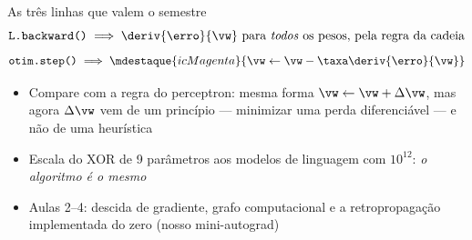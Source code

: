 \documentclass[aspectratio=169, 11pt]{beamer}
\begin{document}
\begin{frame}{As três linhas que valem o semestre}
  \[
    \texttt{L.backward()}
    \;\Longrightarrow\;
    \deriv{\erro}{\vw} \text{ para \emph{todos} os pesos, pela regra da cadeia}
  \]
  \[
    \texttt{otim.step()}
    \;\Longrightarrow\;
    \mdestaque{icMagenta}{\vw \leftarrow \vw - \taxa \deriv{\erro}{\vw}}
  \]

  \begin{itemize}\setlength{\itemsep}{0.35ex}
    \item Compare com a regra do perceptron: mesma forma
          \(\vw \leftarrow \vw + \Delta\vw\), mas agora \(\Delta\vw\) vem de um
          \alert{princípio} — minimizar uma perda diferenciável — e não de uma
          heurística
    \item Escala do XOR de 9 parâmetros aos modelos de linguagem com
          $10^{12}$: \emph{o algoritmo é o mesmo}
    \item Aulas 2--4: descida de gradiente, grafo computacional e a
          retropropagação implementada do zero (nosso mini-autograd)
  \end{itemize}
\end{frame}
\end{document}
